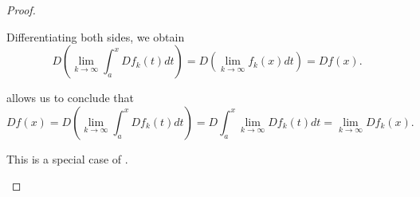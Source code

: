 \begin{proof}
\begin{description}
    Differentiating both sides, we obtain
    \begin{equation*}
      D\left(\lim_{k \to \infty} \int_a^x D f_k(t) dt \right)
      =
      D\left(\lim_{k \to \infty} f_k(x) dt \right)
      =
      D f(x).
    \end{equation*}

     allows us to conclude that
    \begin{equation*}
      D f(x)
      =
      D\left(\lim_{k \to \infty} \int_a^x D f_k(t) dt \right)
      =
      D \int_a^x \lim_{k \to \infty} D f_k(t) dt
      =
      \lim_{k \to \infty} D f_k(x).
    \end{equation*}

     This is a special case of .
  \end{description}
\end{proof}
